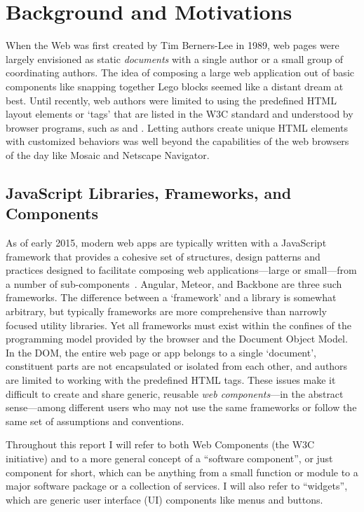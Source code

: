 \chapter{Background and Motivations}
%
\label{ch:background}

When the Web was first created by Tim Berners-Lee in 1989, web pages were largely envisioned as static \textit{documents} with a single author or a small group of coordinating authors. 
The idea of composing a large web application out of basic components like snapping together Lego blocks seemed like a distant dream at best.
Until recently, web authors were limited to using the predefined HTML layout elements or `tags' that are listed in the W3C standard and understood by browser programs, such as  and . 
Letting authors create unique HTML elements with customized behaviors was well beyond the capabilities of the web browsers of the day like Mosaic
and Netscape Navigator.

\section{JavaScript Libraries, Frameworks, and Components}
As of early 2015, modern web apps are typically written with a JavaScript framework that provides a cohesive set of structures, design patterns and practices designed to facilitate composing web applications---large or small---from a number of sub-com\-ponents~\cite{dickey2014}.
Angular, Meteor, and Backbone are three such frameworks.
The difference between a `framework' and a library is somewhat arbitrary, but typically frameworks are more comprehensive than narrowly focused utility libraries.
Yet all frameworks must exist within the confines of the programming model provided by the browser and the Document Object Model. 
In the DOM, the entire web page or app belongs to a single `document', constituent parts are not encapsulated or isolated from each other, and authors are limited to working with the predefined HTML tags.
These issues make it difficult to create and share generic, reusable \textit{web components}---in the abstract sense---among different users who may not use the same frameworks or follow the same set of assumptions and conventions.

Throughout this report I will refer to both Web Components (the W3C initiative) and to a more general concept of a ``software component'', 
or just component for short, 
which can be anything from a small function or module to a major software package or a collection of services.
I will also refer to ``widgets'', which are generic user interface (UI) components like menus and buttons.

